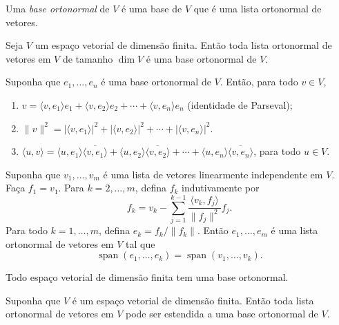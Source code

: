 \documentclass{article}
\DeclareMathOperator{\spn}{span}
\begin{document}
\begin{defn}
    Uma \emph{base ortonormal} de \(V\) é uma base de \(V\) que é uma lista ortonormal de vetores.
\end{defn}

\begin{prop}
    Seja \(V\) um espaço vetorial de dimensão finita. Então toda lista ortonormal de vetores em \(V\) de tamanho \(\dim V\) é uma base ortonormal de \(V\).
\end{prop}

\begin{prop} 
    Suponha que \(e_1, \ldots, e_n\) é uma base ortonormal de \(V\). Então, para todo \(v \in V\),
    \begin{enumerate}
        \item [(a)] \(v = \langle v, e_1 \rangle e_1 + \langle v, e_2 \rangle e_2 + \cdots + \langle v, e_n \rangle e_n\) (identidade de Parseval);
        \item [(b)] \(\|v\|^2 = |\langle v, e_1 \rangle|^2 + |\langle v, e_2 \rangle|^2 + \cdots + |\langle v, e_n \rangle|^2\).
        \item [(c)] \(\langle u, v \rangle = \langle u, e_1 \rangle \overline{\langle v, e_1 \rangle} + \langle u, e_2 \rangle \overline{\langle v, e_2 \rangle} + \cdots + \langle u, e_n \rangle \overline{\langle v, e_n \rangle}\), para todo \(u \in V\).
    \end{enumerate}
\end{prop}

\begin{thm} 
    Suponha que \(v_1, \ldots, v_m\) é uma lista de vetores linearmente independente em \(V\). Faça \(f_1 = v_1\). Para \(k=2, \ldots, m\), defina \(f_k\) indutivamente por 
    \[
        f_k = v_k - \sum_{j=1}^{k-1} \frac{\langle v_k, f_j \rangle}{\|f_j\|^2} f_j.
    \]
    Para todo \(k = 1, \ldots, m\), defina \(e_k = f_k/\|f_k\|\). Então \(e_1, \ldots, e_m\) é uma lista ortonormal de vetores em \(V\) tal que
    \[
        \spn(e_1, \ldots, e_k) = \spn(v_1, \ldots, v_k).
    \]
\end{thm}

\begin{prop}
    Todo espaço vetorial de dimensão finita tem uma base ortonormal.
\end{prop}

\begin{cor}
    Suponha que \(V\) é um espaço vetorial de dimensão finita. Então toda lista ortonormal de vetores em \(V\) pode ser estendida a uma base ortonormal de \(V\).
\end{cor}
\end{document}
